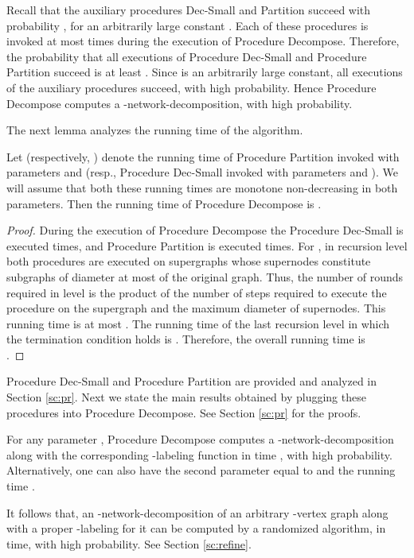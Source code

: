 \documentclass[11pt]{article}
\begin{document}
Recall that the auxiliary procedures Dec-Small and Partition succeed with probability , for an arbitrarily large constant . Each of these procedures is invoked at most  times during the execution of Procedure Decompose. Therefore, the probability that all executions of Procedure Dec-Small and Procedure Partition succeed is at least . Since  is an arbitrarily large constant, all executions of the auxiliary procedures succeed, with high probability. Hence Procedure Decompose computes a -network-decomposition, with high probability.

The next lemma analyzes the running time of the algorithm. \begin{lem} \label{dectime}
Let  (respectively, ) denote the running time of Procedure Partition invoked with parameters  and  (resp., Procedure Dec-Small invoked with parameters  and ). We will assume that both these running times are monotone non-decreasing in both parameters. 
Then the running time of Procedure Decompose is .
\end{lem}
\begin{proof}
During the execution of Procedure Decompose the Procedure Dec-Small is executed  times, and Procedure Partition is executed  times. For , in recursion level  both procedures are executed on supergraphs whose supernodes constitute subgraphs of diameter at most  of the original graph. Thus, the number of rounds required in level  is the product of the number of steps required to execute the procedure on the supergraph and the maximum diameter of supernodes. This running time is at most . The running time of the last recursion level  in which the termination condition holds is . Therefore, the overall running time is \\
.
\end{proof}
Procedure Dec-Small and Procedure Partition are provided and analyzed in Section \ref{sc:pr}. Next we state the main results obtained by plugging these procedures into Procedure Decompose. See Section \ref{sc:pr} for the proofs.

\begin{thm} \label{dlarge}
For any parameter , Procedure Decompose computes a -network-decomposition along with the corresponding -labeling function in time , with high probability. Alternatively, one can also have the second parameter equal to  and the running time .
\end{thm}



It follows that, an -network-decomposition of an arbitrary -vertex graph along with a proper -labeling for it can be computed by a randomized algorithm, in  time, with high probability. See Section \ref{sc:refine}.
\end{document}
